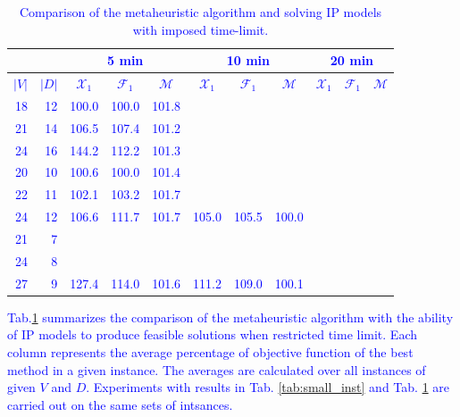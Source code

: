 \begin{table}[]
\centering
\setlength{\tabcolsep}{7pt} %
\renewcommand{\arraystretch}{1.4} %
\textcolor{blue}{
\begin{tabular}{rrrrrrrrrrr}
\multicolumn{1}{l}{}      & \multicolumn{1}{l}{}      & \multicolumn{3}{c}{5 min}  & \multicolumn{3}{c}{10 min} & \multicolumn{3}{c}{20 min}     \\\hline
\multicolumn{1}{l}{$|V|$} & \multicolumn{1}{l}{$|D|$} & \multicolumn{1}{c}{$\mathcal{X}_1$} & \multicolumn{1}{c}{$\mathcal{F}_1$} & \multicolumn{1}{c}{$\mathcal{M}$} & \multicolumn{1}{c}{$\mathcal{X}_1$} & \multicolumn{1}{c}{$\mathcal{F}_1$} & \multicolumn{1}{c}{$\mathcal{M}$} & \multicolumn{1}{c}{$\mathcal{X}_1$} & \multicolumn{1}{c}{$\mathcal{F}_1$} & \multicolumn{1}{c}{$\mathcal{M}$} \\
\hline
18  & 12   &100.0&100.0&101.8 &   &    &    &    &    &       \\
21  & 14   &106.5&107.4&101.2&   &    &    &    &    &       \\
24  & 16   &144.2&112.2&101.3&   &    &    &    &    &   \\     
\hline
20  & 10   &100.6&100.0&101.4&   &    &    &    &    &       \\
22  & 11   &102.1&103.2&101.7&   &    &    &    &    &       \\
24  & 12   &106.6&111.7&101.7&105.0&105.5&100.0&    &    &   \\                               
\hline
21  & 7    & & & &   &    &    &    &    &       \\
24  & 8    &     &   &   &   &    &    &    &    &       \\
27  & 9    &127.4&114.0&101.6&111.2&109.0&100.1&    &    &                                  
\end{tabular}
}
\caption{\textcolor{blue}{Comparison of the metaheuristic algorithm and solving IP models with imposed time-limit.}}
\label{tab:metamod}
\end{table}

\textcolor{blue}{
Tab.\ref{tab:metamod} summarizes the comparison of the metaheuristic algorithm with the ability of IP models to produce feasible solutions when restricted time limit.
Each column represents the average percentage of objective function of the best method in a given instance.
The averages are calculated over all instances of given $V$ and $D$.
Experiments with results in Tab. \ref{tab:small_inst} and Tab. \ref{tab:metamod} are carried out on the same sets of intsances.
}

